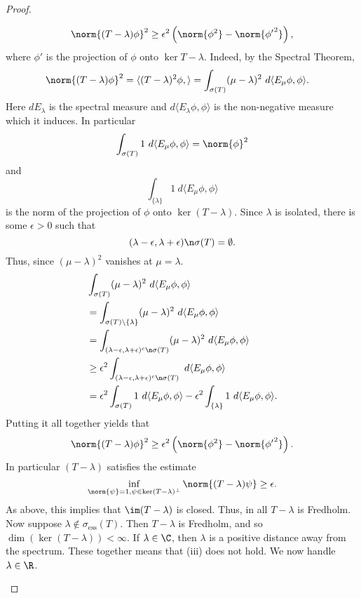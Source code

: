 \documentclass[12pt]{article}
\newcommand{\ess}{\sigma_{\text{ess}}}
\begin{document}
\begin{proof}
\begin{enumerate}[label = (\roman*)]
 \[\norm{(T-\lambda)\phi}^2 \geq \epsilon^2\left(\norm{\phi^2} - \norm{{\phi'}^2}\right),\] where $\phi'$ is the projection of $\phi$ onto $\ker T-\lambda$. Indeed, by the Spectral Theorem,
\begin{align*}
\norm{(T-\lambda)\phi}^2 &= \langle (T-\lambda)^2\phi,\rangle = \int_{\sigma(T)}(\mu-\lambda)^2\ d\langle E_\mu\phi,\phi\rangle.\end{align*}
Here $dE_{\lambda}$ is the spectral measure and $d\langle E_{\lambda}\phi,\phi\rangle$ is the non-negative measure which it induces. In particular
\[\int_{\sigma(T)} 1\ d\langle E_{\mu}\phi,\phi\rangle = \norm{\phi}^2\]
and
\[\int_{\{\lambda\}} 1\ d\langle E_{\mu}\phi,\phi\rangle\] is the norm of the projection of $\phi$ onto $\ker (T-\lambda)$. Since $\lambda$ is isolated, there is some $\epsilon > 0$ such that \[(\lambda-\epsilon,\lambda+\epsilon) \n \sigma(T) = \emptyset.\]
Thus, since $(\mu-\lambda)^2$ vanishes at $\mu=\lambda$.
\begin{align*}
&\int_{\sigma(T)}(\mu-\lambda)^2 \ d\langle E_\mu\phi,\phi\rangle\\
 &= \int_{\sigma(T)\setminus\{\lambda\}} (\mu-\lambda)^2\ d\langle E_\mu\phi,\phi\rangle\\
 &=\int_{(\lambda-\epsilon,\lambda+\epsilon)^c\n\sigma(T) }(\mu-\lambda)^2\ d\langle E_\mu\phi,\phi\rangle\\
 &\geq \epsilon^2 \int_{(\lambda-\epsilon,\lambda+\epsilon)^c\n\sigma(T)}\ d\langle E_\mu\phi,\phi\rangle\\
 &= \epsilon^2\int_{\sigma(T)} 1 \ d\langle E_{\mu}\phi,\phi\rangle-\epsilon^2\int_{\{\lambda\}} 1 \  d\langle E_{\mu}\phi,\phi\rangle.\end{align*}
 Putting it all together yields that
 \[\norm{(T-\lambda)\phi}^2 \geq \epsilon^2\left(\norm{\phi^2} - \norm{{\phi'}^2}\right).\]
 In particular $(T-\lambda)$ satisfies the estimate
 \[\inf_{\norm{\psi} = 1, \psi \in \ker (T-\lambda)^{\bot}} \norm{(T-\lambda)\psi} \geq \epsilon.\] As above, this implies that $\im (T-\lambda)$ is closed. Thus, in all $T-\lambda$ is Fredholm.\\[2ex]
 
Now suppose $\lambda \not \in \ess(T)$. Then $T-\lambda$ is Fredholm, and so $\dim(\ker(T-\lambda)) < \infty$. If $\lambda \in \C$, then $\lambda$ is a positive distance away from the spectrum. These together means that (iii) does not hold. We now handle $\lambda \in \R$.


\end{enumerate}
\end{proof}
\end{document}
